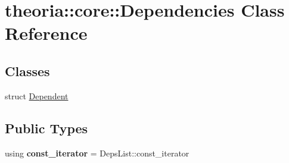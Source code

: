 \hypertarget{classtheoria_1_1core_1_1Dependencies}{}\section{theoria\+:\+:core\+:\+:Dependencies Class Reference}
\label{classtheoria_1_1core_1_1Dependencies}
\subsection*{Classes}
\begin{DoxyCompactItemize}
\item 
struct \hyperlink{structtheoria_1_1core_1_1Dependencies_1_1Dependent}{Dependent}
\end{DoxyCompactItemize}
\subsection*{Public Types}
\begin{DoxyCompactItemize}
\item 
\mbox{\label{classtheoria_1_1core_1_1Dependencies_af58b879e807df8fb52b96c9ab1eb6073}} 
using {\bfseries const\+\_\+iterator} = Deps\+List\+::const\+\_\+iterator
\end{DoxyCompactItemize}
